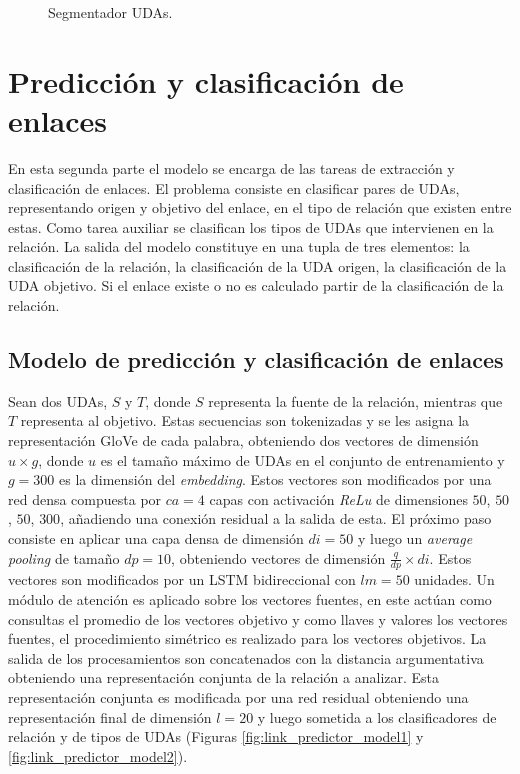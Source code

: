 \documentclass[a4paper,11pt,twocolumn,twoside]{article}
\begin{document}
\begin{figure}[h]
	\centering
	
	\caption{Segmentador UDAs.}
	\label{fig:segmenter_model}
\end{figure}

\section{Predicción y clasificación de enlaces}

En esta segunda parte el modelo se encarga de las tareas de extracción y clasificación de enlaces.
El problema consiste en clasificar pares de UDAs, representando origen y objetivo del enlace, 
en el tipo de relación que existen entre estas.
Como tarea auxiliar se clasifican los tipos de UDAs que intervienen en la relación. La salida 
del modelo constituye en una tupla de tres elementos: la clasificación de la relación, 
la clasificación de la UDA origen, la clasificación de la UDA objetivo. Si el enlace existe o no 
es calculado partir de la clasificación de la relación.   

\subsection{Modelo de predicción y clasificación de enlaces}

Sean dos UDAs, $S$ y $T$, donde $S$ representa la fuente de la relación, mientras que $T$ representa
al objetivo. Estas secuencias son tokenizadas y se les asigna la representación GloVe de cada palabra, obteniendo
dos vectores de dimensión $u \times g$, donde $u$ es el tamaño máximo de UDAs en el conjunto de entrenamiento
y $g=300$ es la dimensión del \textit{embedding}.
Estos vectores son modificados por una red densa compuesta por $ca = 4$ capas con activación \textit{ReLu}
de dimensiones $50$, $50$, $50$, $300$, añadiendo una conexión residual a la salida de esta. 
El próximo paso consiste en aplicar una capa densa de dimensión $di=50$ y luego un \textit{average pooling}
de tamaño $dp=10$, obteniendo vectores de dimensión $\frac{q}{dp} \times di$. 
Estos vectores son modificados por un LSTM bidireccional con $lm=50$ unidades. Un módulo de atención es aplicado 
sobre los vectores fuentes, 
en este actúan como consultas el promedio de los vectores objetivo y como llaves y valores los vectores fuentes,
el procedimiento simétrico es realizado para los vectores objetivos.
La salida de los procesamientos son concatenados con la distancia argumentativa obteniendo una representación 
conjunta de la relación a analizar. Esta representación conjunta es modificada por una red residual obteniendo
una representación final de dimensión $l=20$ y luego sometida a los clasificadores de relación y de tipos de UDAs
(Figuras \ref{fig:link_predictor_model1} y \ref{fig:link_predictor_model2}).
\end{document}
